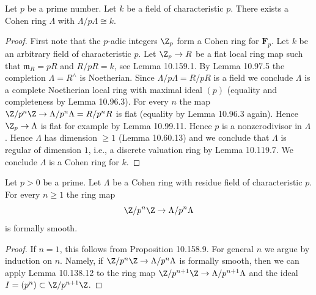 \begin{lemma}[10.160.6]
Let $p$ be a prime number. Let $k$ be a field of characteristic $p$. There exists a Cohen ring $\Lambda$ with $\Lambda/p\Lambda\cong k$.
\end{lemma}
\begin{proof}
First note that the $p$-adic integers $\Z_p$ form a Cohen ring for $\mathbf F_p$. Let $k$ be an arbitrary field of characteristic $p$. Let $\Z_p\to R$ be a flat local ring map such that $\mathfrak m_R=pR$ and $R/pR=k$, see Lemma 10.159.1. By Lemma 10.97.5 the completion $\Lambda=R^\wedge$ is Noetherian. Since $\Lambda/p\Lambda=R/pR$ is a field we conclude $\Lambda$ is a complete Noetherian local ring with maximal ideal $(p)$ (equality and completeness by Lemma 10.96.3). For every $n$ the map $\Z/p^n\Z\to\Lambda/p^n\Lambda=R/p^nR$ is flat (equality by Lemma 10.96.3 again). Hence $\Z_p\to\Lambda$ is flat for example by Lemma 10.99.11. Hence $p$ is a nonzerodivisor in $\Lambda$. Hence $\Lambda$ has dimension $\geq1$ (Lemma 10.60.13) and we conclude that $\Lambda$ is regular of dimension $1$, i.e., a discrete valuation ring by Lemma 10.119.7. We conclude $\Lambda$ is a Cohen ring for $k$.
\end{proof}
\begin{lemma}[10.160.7]
Let $p>0$ be a prime. Let $\Lambda$ be a Cohen ring with residue field of characteristic $p$. For every $n\geq1$ the ring map
\[
\Z/p^n\Z\to\Lambda/p^n\Lambda
\]
is formally smooth.
\end{lemma}
\begin{proof}
If $n=1$, this follows from Proposition 10.158.9. For general $n$ we argue by induction on $n$. Namely, if $\Z/p^n\Z\to\Lambda/p^n\Lambda$ is formally smooth, then we can apply Lemma 10.138.12 to the ring map $\Z/p^{n+1}\Z\to\Lambda/p^{n+1}\Lambda$ and the ideal $I=(p^n)\subset\Z/p^{n+1}\Z$.
\end{proof}

